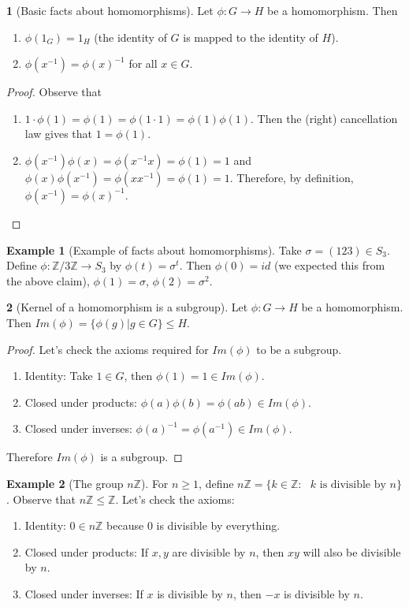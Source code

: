 \documentclass[12pt]{article}
\theoremstyle{definition}
\newtheorem{theorem}{\color{ForestGreen}{\textbf{Theorem}}}
\newtheorem{example}{\color{WildStrawberry}Example}
\theoremstyle{definition}
\begin{document}
\begin{theorem}[Basic facts about homomorphisms]
Let $\phi : G \to H$ be a homomorphism. Then
\begin{enumerate}
	\item $\phi(1_G) = 1_H$ (the identity of $G$ is mapped to the identity of $H$).
	\item $\phi(x^{-1}) = \phi(x)^{-1}$ for all $x \in G$.
\end{enumerate}
\end{theorem}
\begin{proof}
Observe that
\begin{enumerate}
	\item $1 \cdot \phi(1) = \phi(1) = \phi(1 \cdot 1) = \phi(1)\phi(1)$. Then the (right) cancellation law gives that $1 = \phi(1)$.
	\item $\phi(x^{-1})\phi(x) = \phi(x^{-1}x) = \phi(1) = 1$ and $\phi(x)\phi(x^{-1}) = \phi(xx^{-1}) = \phi(1) = 1$. Therefore, by definition, $\phi(x^{-1}) = \phi(x)^{-1}$.
\end{enumerate}
\end{proof}

\begin{example}[Example of facts about homomorphisms]
Take $\sigma = (1 2 3) \in S_3$. Define $\phi : \mathbb{Z} / 3 \mathbb{Z} \to S_3$ by $\phi(t) = \sigma^t$. Then $\phi(0) = id$ (we expected this from the above claim), $\phi(1) = \sigma$, $\phi(2) = \sigma^2$. 
\end{example}

\begin{theorem}[Kernel of a homomorphism is a subgroup]
Let $\phi : G \to H$ be a homomorphism. Then $Im(\phi) = \{ \phi(g) | g \in G \} \leq H$.
\end{theorem}
\begin{proof}
Let's check the axioms required for $Im(\phi)$ to be a subgroup.
\begin{enumerate}
	\item Identity: Take $1 \in G$, then $\phi(1) = 1 \in Im(\phi)$.
	\item Closed under products: $\phi(a)\phi(b) = \phi(ab) \in Im(\phi)$.
	\item Closed under inverses: $\phi(a)^{-1} = \phi(a^{-1}) \in Im(\phi)$.
\end{enumerate}
Therefore $Im(\phi)$ is a subgroup.
\end{proof}

\begin{example}[The group $n \mathbb{Z}$]
For $n \geq 1$, define $n \mathbb{Z} = \{ k \in \mathbb{Z} : \text{ $k$ is divisible by $n$} \}$. Observe that $n \mathbb{Z} \leq \mathbb{Z}$. Let's check the axioms:
\begin{enumerate}
	\item Identity: $0 \in n \mathbb{Z}$ because $0$ is divisible by everything. 
	\item Closed under products: If $x,y$ are divisible by $n$, then $xy$ will also be divisible by $n$.
	\item Closed under inverses: If $x$ is divisible by $n$, then $-x$ is divisible by $n$.
\end{enumerate}
\end{example}
\end{document}
